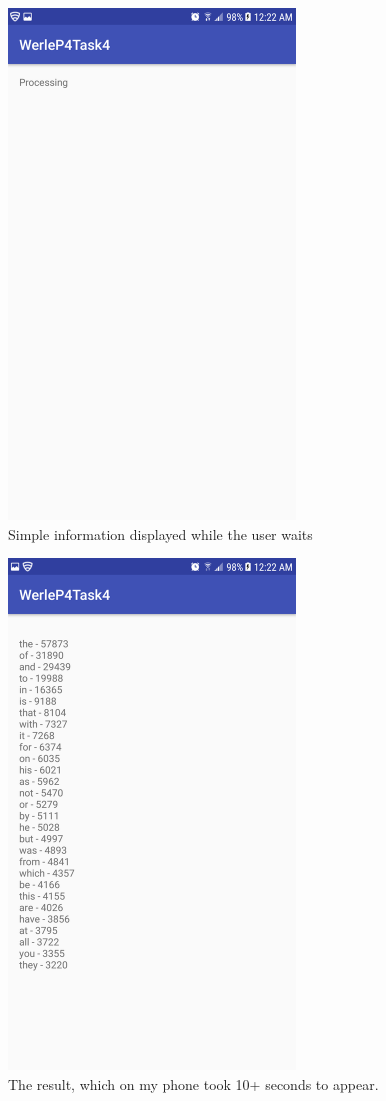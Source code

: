 \documentclass[11pt]{article}
\begin{document}
	\begin{figure}[ht]
		\includegraphics[width=3in]{img/t4s3.png}
		\centering
		\caption{Simple information displayed while the user waits}
	\end{figure}
	\begin{figure}[ht]
		\includegraphics[width=3in]{img/t4s4.png}
		\centering
		\caption{The result, which on my phone took 10+ seconds to appear.}
	\end{figure}
\end{document}

